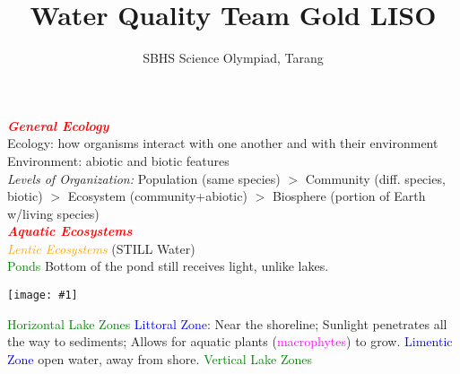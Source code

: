 \documentclass{article}
\title{Water Quality Team Gold LISO}
\author{SBHS Science Olympiad, Tarang}
\newcommand{\red}[1]{\textcolor{red}{#1}}
\newcommand{\green}[1]{\textcolor{green}{#1}}
\newcommand{\blue}[1]{\textcolor{blue}{#1}}
\newcommand{\pink}[1]{\textcolor{magenta}{#1}}
\newcommand{\orange}[1]{\textcolor{orange}{#1}}
\newcommand{\mysection}[1]{\textbf{\textit{\red{#1}}}}
\newcommand{\mysubsection}[1]{{\textit{\orange{#1}}}}
\newcommand{\mysubsub}[1]{{{\green{#1}}}}
\newcommand{\mysubsubsub}[1]{{{\blue{#1}}}}
\newcommand{\vocab}[1]{{\pink{#1}}}
\newcommand{\fig}[1]{
	\texttt{[image: \#1]}
}
\begin{document}
	\begin{multicols*}{4}
		
		\noindent
		\mysection{General Ecology} \\
		Ecology: how organisms interact with one another and with their environment \\
		Environment: abiotic and biotic features\\
		\textit{Levels of Organization:} Population (same species) $>$  Community (diff. species, biotic) $>$ Ecosystem (community+abiotic) $>$ Biosphere (portion of Earth w/living species)
		\\
		\mysection{Aquatic Ecosystems} \\
		\mysubsection{Lentic Ecosystems} (STILL Water) \\
		\mysubsub{Ponds} Bottom of the pond still receives light, unlike lakes.
		\fig{lakezones}
		\mysubsub{Horizontal Lake Zones}
		\mysubsubsub{Littoral Zone}: Near the shoreline; Sunlight penetrates all the way to sediments; Allows for aquatic plants (\vocab{macrophytes}) to grow.
		\mysubsubsub{Limentic Zone} open water, away from shore.
		\mysubsub{Vertical Lake Zones}
		
		
	\end{multicols*}
\end{document}
